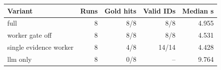 \begin{tabular}{lrrrr}
\hline
Variant & Runs & Gold hits & Valid IDs & Median s \\
\hline
full & 8 & 8/8 & 8/8 & 4.955 \\
worker gate off & 8 & 8/8 & 8/8 & 4.531 \\
single evidence worker & 8 & 4/8 & 14/14 & 4.428 \\
llm only & 8 & 0/8 & -- & 9.764 \\
\hline
\end{tabular}
